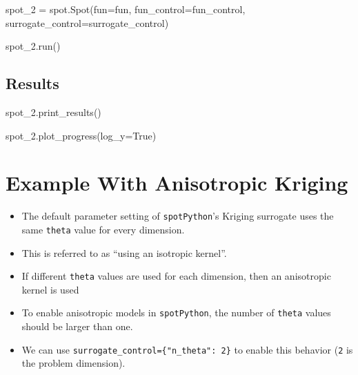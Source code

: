 \documentclass[
  letterpaper,
  DIV=11,
  numbers=noendperiod]{scrreprt}
\newenvironment{Shaded}{\begin{snugshade}}{\end{snugshade}}
\newcommand{\NormalTok}[1]{\textcolor[rgb]{0.00,0.23,0.31}{#1}}
\newcommand{\OperatorTok}[1]{\textcolor[rgb]{0.37,0.37,0.37}{#1}}
\newcommand{\VariableTok}[1]{\textcolor[rgb]{0.07,0.07,0.07}{#1}}
\providecommand{\tightlist}{%
  \setlength{\itemsep}{0pt}\setlength{\parskip}{0pt}}\usepackage{longtable,booktabs,array}
\begin{document}
\begin{Shaded}
\begin{Highlighting}[]
\NormalTok{spot\_2 }\OperatorTok{=}\NormalTok{ spot.Spot(fun}\OperatorTok{=}\NormalTok{fun,}
\NormalTok{                   fun\_control}\OperatorTok{=}\NormalTok{fun\_control,}
\NormalTok{                   surrogate\_control}\OperatorTok{=}\NormalTok{surrogate\_control)}

\NormalTok{spot\_2.run()}
\end{Highlighting}
\end{Shaded}

\subsection{Results}\label{results-1}

\begin{Shaded}
\begin{Highlighting}[]
\NormalTok{spot\_2.print\_results()}
\end{Highlighting}
\end{Shaded}

\begin{Shaded}
\begin{Highlighting}[]
\NormalTok{spot\_2.plot\_progress(log\_y}\OperatorTok{=}\VariableTok{True}\NormalTok{)}
\end{Highlighting}
\end{Shaded}

\section{Example With Anisotropic
Kriging}\label{example-with-anisotropic-kriging}

\begin{itemize}
\tightlist
\item
  The default parameter setting of \texttt{spotPython}'s Kriging
  surrogate uses the same \texttt{theta} value for every dimension.
\item
  This is referred to as ``using an isotropic kernel''.
\item
  If different \texttt{theta} values are used for each dimension, then
  an anisotropic kernel is used
\item
  To enable anisotropic models in \texttt{spotPython}, the number of
  \texttt{theta} values should be larger than one.
\item
  We can use \texttt{surrogate\_control=\{"n\_theta":\ 2\}} to enable
  this behavior (\texttt{2} is the problem dimension).
\end{itemize}
\end{document}
